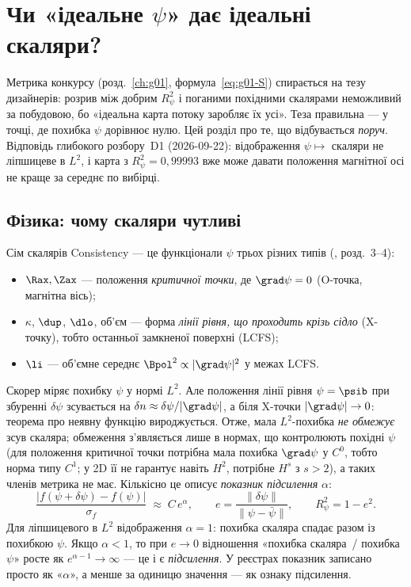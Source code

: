 \chapter{Чи «ідеальне \texorpdfstring{$\psi$}{ψ}» дає ідеальні скаляри?}\label{ch:g02}

Метрика конкурсу (розд.~\ref{ch:g01}, формула~\eqref{eq:g01-S}) спирається на тезу
дизайнерів: розрив між добрим $R^2_\psi$ і поганими похідними скалярами неможливий за
побудовою, бо «ідеальна карта потоку заробляє їх усі». Теза правильна --- у точці, де
похибка $\psi$ дорівнює нулю. Цей розділ про те, що відбувається \emph{поруч}. Відповідь
глибокого розбору~D1 (2026-09-22): відображення $\psi\mapsto$ скаляри не ліпшицеве в
$L^2$, і карта з $R^2_\psi=0{,}99993$ вже може давати положення магнітної осі не краще
за середнє по вибірці.

\section{Фізика: чому скаляри чутливі}\label{sec:g02-physics}

Сім скалярів Consistency --- це функціонали $\psi$ трьох різних типів (\cite{Manual},
розд.~3--4):
\begin{itemize}
\item $\Rax,\Zax$ --- положення \emph{критичної точки}, де $\grad\psi=0$ (O-точка, магнітна вісь);
\item $\kappa$, $\dup$, $\dlo$, об'єм --- форма \emph{лінії рівня, що проходить крізь
  сідло} (X-точку), тобто останньої замкненої поверхні (LCFS);
\item $\li$ --- об'ємне середнє $\Bpol^2\propto|\grad\psi|^2$ у межах LCFS.
\end{itemize}
Скорер міряє похибку $\psi$ у нормі $L^2$. Але положення лінії рівня $\psi=\psib$ при
збуренні $\delta\psi$ зсувається на $\delta n\approx\delta\psi/|\grad\psi|$, а біля X-точки
$|\grad\psi|\to0$: теорема про неявну функцію вироджується. Отже, мала $L^2$-похибка
\emph{не обмежує} зсув скаляра; обмеження з'являється лише в нормах, що контролюють
похідні $\psi$ (для положення критичної точки потрібна мала похибка $\grad\psi$ у $C^0$, тобто норма
типу $C^1$; у 2D її не гарантує навіть $H^2$, потрібне $H^s$ з $s>2$), а таких членів метрика не має. Кількісно це описує \emph{показник підсилення}
$\alpha$:
\begin{equation}\label{eq:g02-alpha}
\frac{|f(\psi+\delta\psi)-f(\psi)|}{\sigma_f}\;\approx\;C\,e^{\alpha},\qquad
e=\frac{\|\delta\psi\|}{\|\psi-\bar\psi\|},\qquad R^2_\psi=1-e^2 .
\end{equation}
Для ліпшицевого в $L^2$ відображення $\alpha=1$: похибка скаляра спадає разом із похибкою
$\psi$. Якщо $\alpha<1$, то при $e\to0$ відношення «похибка скаляра~/ похибка $\psi$»
росте як $e^{\alpha-1}\to\infty$ --- це і є \emph{підсилення}. У реєстрах показник
записано просто як «$\alpha$», а менше за одиницю значення --- як ознаку підсилення.

